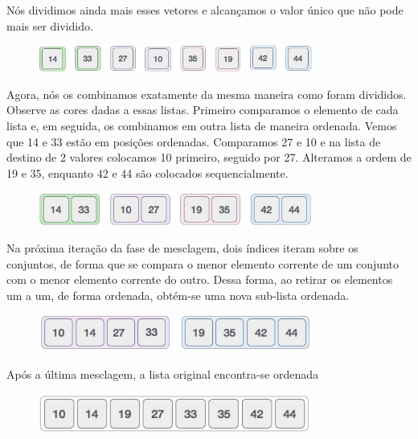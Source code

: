 Nós dividimos ainda mais esses vetores e alcançamos o valor único que não pode mais ser dividido. 

\begin{figure}[!htb]
\centering
\includegraphics[width=9cm]{img/merge4.jpg}
\label{fig:merge4}
\end{figure}

Agora, nós os combinamos exatamente da mesma maneira como foram divididos. Observe as cores dadas a essas listas. Primeiro comparamos o elemento de cada lista e, em seguida, os combinamos em outra lista de maneira ordenada. Vemos que 14 e 33 estão em posições ordenadas. Comparamos 27 e 10 e na lista de destino de 2 valores colocamos 10 primeiro, seguido por 27. Alteramos a ordem de 19 e 35, enquanto 42 e 44 são colocados sequencialmente. 

\begin{figure}[!htb]
\centering
\includegraphics[width=9cm]{img/merge5.jpg}
\label{fig:merge5}
\end{figure}

Na próxima iteração da fase de mesclagem, dois índices iteram sobre os conjuntos, de forma que se compara o menor elemento corrente de um conjunto com o menor elemento corrente do outro. Dessa forma, ao retirar os elementos um a um, de forma ordenada, obtém-se uma nova sub-lista ordenada.

\begin{figure}[!htb]
\centering
\includegraphics[width=9cm]{img/merge6.jpg}
\label{fig:merge6}
\end{figure}

Após a última mesclagem, a lista original encontra-se ordenada

\begin{figure}[!htb]
\centering
\includegraphics[width=9cm]{img/merge7.jpg}
\label{fig:merge7}
\end{figure}

